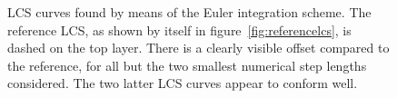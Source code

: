 \begin{figure}[htpb]
    \centering
    
    \caption[LCS curves found by means of the Euler integration scheme]{
        LCS curves found by means of the Euler integration scheme. The
        reference LCS, as shown by itself in figure~\ref{fig:referencelcs},
        is dashed on the top layer. There is a clearly visible offset
        compared to the reference, for all but the two smallest numerical step
        lengths considered. The two latter LCS curves appear to conform well.}
    \label{fig:lcs_euler}
\end{figure}
